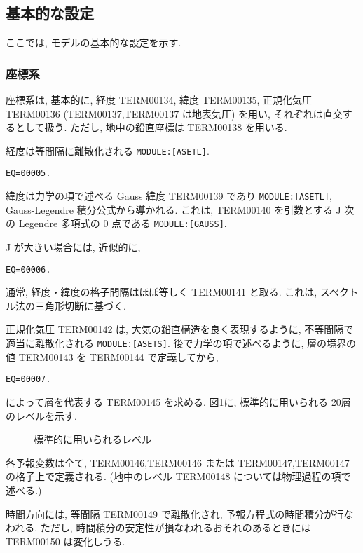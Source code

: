﻿
\subsection{基本的な設定}

ここでは, モデルの基本的な設定を示す.

\subsubsection{座標系}

座標系は, 基本的に,
経度 TERM00134, 緯度 TERM00135, 正規化気圧 TERM00136 
(TERM00137,TERM00137 は地表気圧)
を用い, それぞれは直交するとして扱う.
ただし, 地中の鉛直座標は TERM00138 を用いる.

経度は等間隔に離散化される \texttt{MODULE:[ASETL]}.
\begin{verbatim}
EQ=00005.
\end{verbatim}

緯度は力学の項で述べる Gauss 緯度 TERM00139 であり \texttt{MODULE:[ASETL]},
Gauss-Legendre 積分公式から導かれる.
これは, TERM00140 を引数とする
J 次の Legendre 多項式の 0 点である \texttt{MODULE:[GAUSS]}. 

J が大きい場合には, 近似的に,
\begin{verbatim}
EQ=00006.
\end{verbatim}

通常, 経度・緯度の格子間隔はほぼ等しく TERM00141 と取る. 
これは, スペクトル法の三角形切断に基づく.

正規化気圧 TERM00142 は, 大気の鉛直構造を良く表現するように,
不等間隔で適当に離散化される \texttt{MODULE:[ASETS]}.
後で力学の項で述べるように, 層の境界の値
TERM00143 を TERM00144 で定義してから,
%
\begin{verbatim}
EQ=00007.
\end{verbatim}
によって層を代表する TERM00145 を求める.
図\ref{a-setup:level}に, 標準的に用いられる 20層のレベルを示す.

\begin{figure}[hbtp]
  \begin{center}
  \end{center}
  \caption{標準的に用いられるレベル}
  \label{a-setup:level}
\end{figure}

各予報変数は全て, TERM00146,TERM00146
または TERM00147,TERM00147 の格子上で定義される.
(地中のレベル TERM00148 については物理過程の項で述べる.)

時間方向には, 等間隔 TERM00149 で離散化され,
予報方程式の時間積分が行なわれる.
ただし, 時間積分の安定性が損なわれるおそれのあるときには
TERM00150 は変化しうる.

